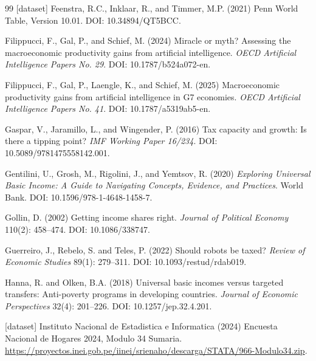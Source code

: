 \documentclass[11pt,a4paper]{article}
\begin{document}
\begin{thebibliography}{99}
[dataset] Feenstra, R.C., Inklaar, R., and Timmer, M.P. (2021)
\newblock Penn World Table, Version 10.01.
\newblock DOI: 10.34894/QT5BCC.

Filippucci, F., Gal, P., and Schief, M. (2024)
\newblock Miracle or myth? Assessing the macroeconomic productivity gains from artificial intelligence.
\newblock \emph{OECD Artificial Intelligence Papers No. 29}. DOI: 10.1787/b524a072-en.

Filippucci, F., Gal, P., Laengle, K., and Schief, M. (2025)
\newblock Macroeconomic productivity gains from artificial intelligence in G7 economies.
\newblock \emph{OECD Artificial Intelligence Papers No. 41}. DOI: 10.1787/a5319ab5-en.

Gaspar, V., Jaramillo, L., and Wingender, P. (2016)
\newblock Tax capacity and growth: Is there a tipping point?
\newblock \emph{IMF Working Paper 16/234}. DOI: 10.5089/9781475558142.001.

Gentilini, U., Grosh, M., Rigolini, J., and Yemtsov, R. (2020)
\newblock \emph{Exploring Universal Basic Income: A Guide to Navigating Concepts, Evidence, and Practices}.
\newblock World Bank. DOI: 10.1596/978-1-4648-1458-7.

Gollin, D. (2002)
\newblock Getting income shares right.
\newblock \emph{Journal of Political Economy} 110(2): 458--474. DOI: 10.1086/338747.

Guerreiro, J., Rebelo, S. and Teles, P. (2022)
\newblock Should robots be taxed?
\newblock \emph{Review of Economic Studies} 89(1): 279--311. DOI: 10.1093/restud/rdab019.

Hanna, R. and Olken, B.A. (2018)
\newblock Universal basic incomes versus targeted transfers: Anti-poverty programs in developing countries.
\newblock \emph{Journal of Economic Perspectives} 32(4): 201--226. DOI: 10.1257/jep.32.4.201.

[dataset] Instituto Nacional de Estadistica e Informatica (2024)
\newblock Encuesta Nacional de Hogares 2024, Modulo 34 Sumaria.
\newblock \url{https://proyectos.inei.gob.pe/iinei/srienaho/descarga/STATA/966-Modulo34.zip}.


\end{thebibliography}
\end{document}
